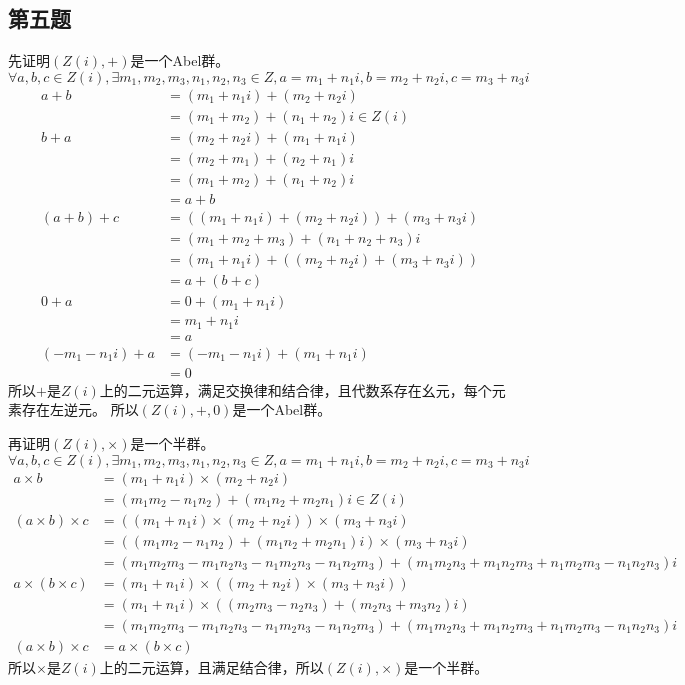 \documentclass[12pt,onecolumn]{article}
\theoremstyle{plain}
\begin{document}
\subsection{第五题}
\begin{proof*}
  先证明$(Z(i), +)$是一个Abel群。
  $\forall a, b, c \in Z(i), \exists m_1, m_2, m_3, n_1, n_2, n_3 \in Z, a = m_1 + n_1i, b = m_2 + n_2i, c = m_3 + n_3i$
  \begin{align*}
    a + b &= (m_1 + n_1i) + (m_2 + n_2i) \\
          &= (m_1 + m_2) + (n_1 + n_2)i \in Z(i) \\
    b + a &= (m_2 + n_2i) + (m_1 + n_1i) \\
          &= (m_2 + m_1) + (n_2 + n_1)i \\
          &= (m_1 + m_2) + (n_1 + n_2)i \\
          &= a + b \\
    (a + b) + c &= ((m_1 + n_1i) + (m_2 + n_2i)) + (m_3 + n_3i) \\
          &= (m_1 + m_2 + m_3) + (n_1 + n_2 + n_3)i \\
          &= (m_1 + n_1i) + ((m_2 + n_2i) + (m_3 + n_3i)) \\
          &= a + (b + c) \\
    0 + a &= 0 + (m_1 + n_1i) \\
          &= m_1 + n_1i \\
          &= a \\
    (-m_1 - n_1i) + a &= (-m_1 - n_1i) + (m_1 + n_1i) \\
          &= 0
  \end{align*}
  所以$+$是$Z(i)$上的二元运算，满足交换律和结合律，且代数系存在幺元，每个元素存在左逆元。
  所以$(Z(i), +, 0)$是一个Abel群。

  再证明$(Z(i), \times)$是一个半群。
  $\forall a, b, c \in Z(i), \exists m_1, m_2, m_3, n_1, n_2, n_3 \in Z, a = m_1 + n_1i, b = m_2 + n_2i, c = m_3 + n_3i$
  \begin{align*}
    a \times b &= (m_1 + n_1i) \times (m_2 + n_2i) \\
          &= (m_1m_2 - n_1n_2) + (m_1n_2 + m_2n_1)i \in Z(i) \\
    (a \times b) \times c &= ((m_1 + n_1i) \times (m_2 + n_2i)) \times (m_3 + n_3i) \\
          &= ((m_1m_2 - n_1n_2) + (m_1n_2 + m_2n_1)i) \times (m_3 + n_3i) \\
          &= (m_1m_2m_3 - m_1n_2n_3 - n_1m_2n_3 - n_1n_2m_3) + (m_1m_2n_3 + m_1n_2m_3 + n_1m_2m_3 - n_1n_2n_3)i \\
    a \times (b \times c) &= (m_1 + n_1i) \times ((m_2 + n_2i) \times (m_3 + n_3i)) \\
          &= (m_1 + n_1i) \times ((m_2m_3 - n_2n_3) + (m_2n_3 + m_3n_2)i) \\
          &= (m_1m_2m_3 - m_1n_2n_3 - n_1m_2n_3 - n_1n_2m_3) + (m_1m_2n_3 + m_1n_2m_3 + n_1m_2m_3 - n_1n_2n_3)i \\
    (a \times b) \times c &= a \times (b \times c)
  \end{align*}
  所以$\times$是$Z(i)$上的二元运算，且满足结合律，所以$(Z(i), \times)$是一个半群。


\end{proof*}
\end{document}
